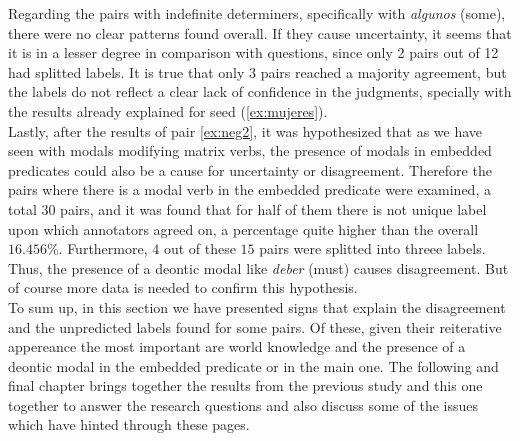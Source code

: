 Regarding the pairs with indefinite determiners, specifically with \textit{algunos} (some), there were no clear patterns found overall. If they cause uncertainty, it seems that it is in a lesser degree in comparison with questions, since only 2 pairs out of 12 had splitted labels. It is true that only 3 pairs reached a majority agreement, but the labels do not reflect a clear lack of confidence in the judgments, specially with the results already explained for seed (\ref{ex:mujeres}).\\

Lastly, after the results of pair \ref{ex:neg2}, it was hypothesized that as we have seen with modals modifying matrix verbs, the presence of modals in embedded predicates could also be a cause for uncertainty or disagreement. Therefore the pairs where there is a modal verb in the embedded predicate were examined, a total 30 pairs, and it was found that for half of them there is not unique label upon which annotators agreed on, a percentage quite higher than the overall $16.456\%$. Furthermore, $4$ out of these $15$ pairs were splitted into threee labels. Thus, the presence of a deontic modal like \textit{deber} (must) causes disagreement. But of course more data is needed to confirm this hypothesis.\\

To sum up, in this section we have presented signs that explain the disagreement and the unpredicted labels found for some pairs. Of these, given their reiterative appereance the most important are world knowledge and the presence of a deontic modal in the embedded predicate or in the main one. The following and final chapter brings together the results from the previous study and this one together to answer the research questions and also discuss some of the issues which have hinted through these pages.\\